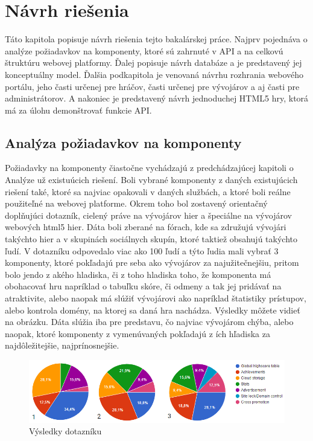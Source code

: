 \chapter{Návrh riešenia}
\label{chap:navrh}
Táto kapitola popisuje návrh riešenia tejto bakalárskej práce. Najprv pojednáva o analýze požiadavkov na komponenty, ktoré sú zahrnuté v API a na celkovú štruktúru webovej platformy. Ďalej popisuje návrh databáze a je predstavený jej konceptuálny model. Ďalšia podkapitola je venovaná návrhu rozhrania webového portálu, jeho časti určenej pre hráčov, časti určenej pre vývojárov a aj časti pre administrátorov. A nakoniec je predstavený návrh jednoduchej HTML5 hry, ktorá má za úlohu demonštrovať funkcie API.  

\section{Analýza požiadavkov na komponenty}
Požiadavky na komponenty čiastočne vychádzajú z predchádzajúcej kapitoli o Analýze už existuúcich riešení. Boli vybrané komponenty z daných existujúcich riešení také, ktoré sa najviac opakovali v daných službách, a ktoré boli reálne použiteľné na webovej platforme. Okrem toho bol zostavený orientačný doplňujúci dotazník, cielený práve na vývojárov hier a špeciálne na vývojárov webových html5 hier. Dáta boli zberané na fórach, kde sa združujú vývojári takýchto hier a v skupinách sociálnych skupín, ktoré taktiež obsahujú takýchto ľudí. V dotazníku odpovedalo viac ako 100 ľudí a týto ľudia mali vybrať 3 komponenty, ktoré pokľadajú pre seba ako vývojárov za najužitečnejšiu, pritom bolo jendo z akého hladiska, či z toho hladiska toho, že komponenta má obohacovať hru napríklad o tabuľku skóre, či odmeny a tak jej pridávať na atraktivite, alebo naopak má slúžiť vývojárovi ako napríklad štatistiky prístupov, alebo kontrola domény, na ktorej sa daná hra nachádza.   Výsledky môžete vidieť na obrázku. Dáta slúžia iba pre predstavu, čo najviac vývojárom chýba, alebo naopak, ktoré komponenty z vymenúvaných pokľadajú z ích hľadiska za najdôležitejšie, najprínosnejšie.
\begin{figure}[h]
  \centering
  \includegraphics[scale=0.7]{fig/graf-dotazniku.png}
  \caption{Výsledky dotazníku}
  \label{fig:dotaznik}
\end{figure}

